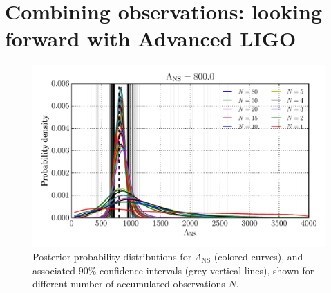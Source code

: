 \documentclass[aps,prd,amsmath,floats,floatfix, twocolumn,
superscriptaddress,nofootinbib,showpacs]{revtex4-1}
\newcommand{\lambdans}{\Lambda_\mathrm{NS}}
\begin{document}
\section{Combining observations: looking forward with Advanced LIGO}\label{s1:multiple_observations}
% 
\begin{figure}
\centering    
\includegraphics[width=1.05\columnwidth]{plots/pdfLambda_vs_N_L800.pdf}
\caption{%
Posterior probability distributions for $\lambdans$ (colored curves), and 
associated $90\%$ confidence intervals (grey vertical lines), shown for 
different number of accumulated observations $N$.
}
\label{fig:TT_Lambda_vs_N_L800_CI90_0}
\end{figure}
%
% 
\end{document}
